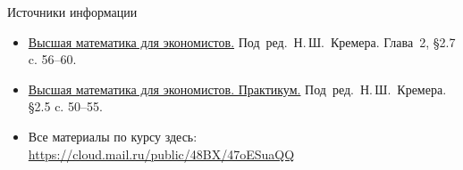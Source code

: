 \documentclass[unicode,11pt,notheorems,xcolor=table]{beamer}
\begin{document}
\begin{frame}{Источники информации}
\begin{itemize}
\item 
	{\color{blue}\href{https://cloud.mail.ru/public/jWCR/2BBwXTrkg}{Высшая математика для экономистов.}} Под~ред.~Н.\,Ш.~Кремера. Глава~2, \S 2.7 c. 56--60.
\item 
	{\color{blue}\href{https://cloud.mail.ru/public/5c87/4Cmo8H9BA}{Высшая математика для экономистов. Практикум.}} Под~ред.~Н.\,Ш.~Кремера.  \S 2.5 c. 50--55.

\item 
	Все материалы по курсу здесь:
{\color{blue}\url{https://cloud.mail.ru/public/48BX/47oESuaQQ}}
\end{itemize}

\end{frame}
\end{document}
